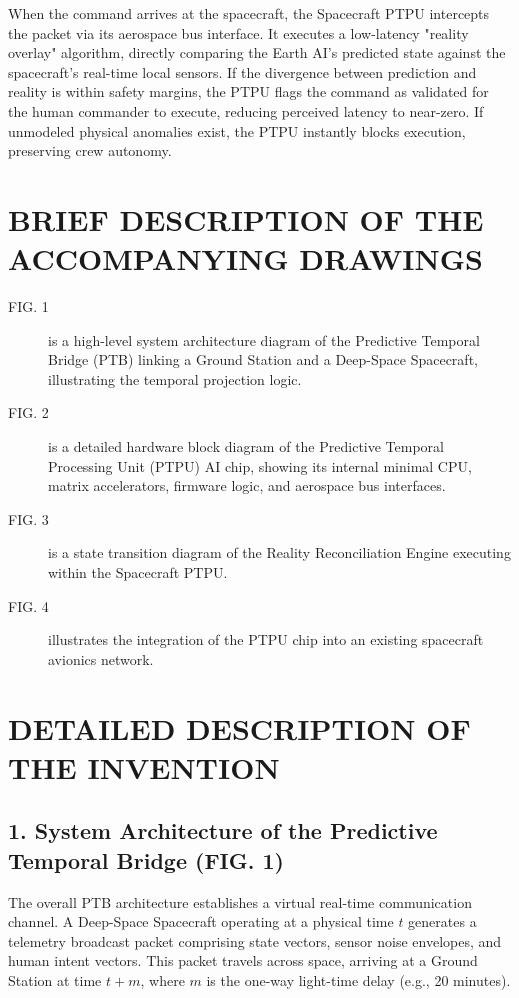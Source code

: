 \documentclass[12pt,a4paper]{article}
\begin{document}
When the command arrives at the spacecraft, the Spacecraft PTPU intercepts the packet via its aerospace bus interface. It executes a low-latency "reality overlay" algorithm, directly comparing the Earth AI's predicted state against the spacecraft's real-time local sensors. If the divergence between prediction and reality is within safety margins, the PTPU flags the command as validated for the human commander to execute, reducing perceived latency to near-zero. If unmodeled physical anomalies exist, the PTPU instantly blocks execution, preserving crew autonomy.

\section*{BRIEF DESCRIPTION OF THE ACCOMPANYING DRAWINGS}
\begin{description}
    \item[FIG. 1] is a high-level system architecture diagram of the Predictive Temporal Bridge (PTB) linking a Ground Station and a Deep-Space Spacecraft, illustrating the temporal projection logic.
    \item[FIG. 2] is a detailed hardware block diagram of the Predictive Temporal Processing Unit (PTPU) AI chip, showing its internal minimal CPU, matrix accelerators, firmware logic, and aerospace bus interfaces.
    \item[FIG. 3] is a state transition diagram of the Reality Reconciliation Engine executing within the Spacecraft PTPU.
    \item[FIG. 4] illustrates the integration of the PTPU chip into an existing spacecraft avionics network.
\end{description}

\section*{DETAILED DESCRIPTION OF THE INVENTION}

\subsection*{1. System Architecture of the Predictive Temporal Bridge (FIG. 1)}
The overall PTB architecture establishes a virtual real-time communication channel. A Deep-Space Spacecraft operating at a physical time $t$ generates a telemetry broadcast packet comprising state vectors, sensor noise envelopes, and human intent vectors. This packet travels across space, arriving at a Ground Station at time $t+m$, where $m$ is the one-way light-time delay (e.g., 20 minutes).
\end{document}
